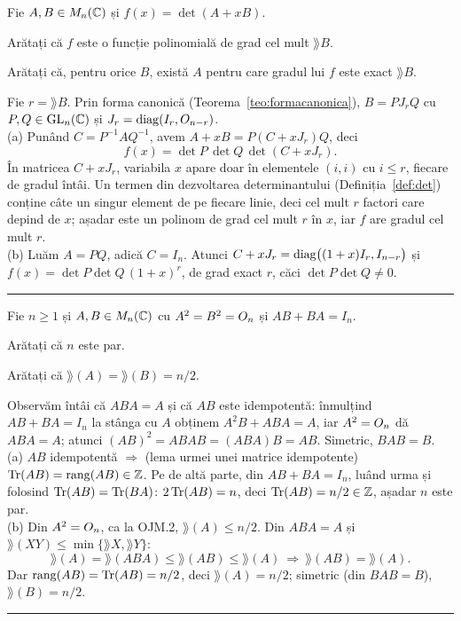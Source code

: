 Fie $A,B\in M_n(\mathbb{C})$ și $f(x)=\det(A+xB)$.
\begin{parti}
  \item Arătați că $f$ este o funcție polinomială de grad cel mult $\rang B$.
  \item Arătați că, pentru orice $B$, există $A$ pentru care gradul lui $f$ este exact $\rang B$.
\end{parti}
\sol Fie $r=\rang B$. Prin forma canonică (Teorema~\ref{teo:formacanonica}), $B=PJ_rQ$ cu $P,Q\in\mathrm{GL}_n(\mathbb{C})$ și $J_r=\operatorname{diag}(I_r,O_{n-r})$.\\[2pt]
(a) Punând $C=P^{-1}AQ^{-1}$, avem $A+xB=P(C+xJ_r)Q$, deci
\[ f(x)=\det P\,\det Q\,\det(C+xJ_r). \]
În matricea $C+xJ_r$, variabila $x$ apare doar în elementele $(i,i)$ cu $i\le r$, fiecare de gradul întâi. Un termen din dezvoltarea determinantului (Definiția~\ref{def:det}) conține câte un singur element de pe fiecare linie, deci cel mult $r$ factori care depind de $x$; așadar este un polinom de grad cel mult $r$ în $x$, iar $f$ are gradul cel mult $r$.\\[2pt]
(b) Luăm $A=PQ$, adică $C=I_n$. Atunci $C+xJ_r=\operatorname{diag}\bigl((1+x)I_r,I_{n-r}\bigr)$ și $f(x)=\det P\det Q\,(1+x)^r$, de grad exact $r$, căci $\det P\det Q\neq0$.
\vspace{1mm}\hrule

Fie $n\ge1$ și $A,B\in M_n(\mathbb{C})$ cu $A^2=B^2=O_n$ și $AB+BA=I_n$.
\begin{parti}
  \item Arătați că $n$ este par.
  \item Arătați că $\rang(A)=\rang(B)=n/2$.
\end{parti}
\sol Observăm întâi că $ABA=A$ și că $AB$ este idempotentă: înmulțind $AB+BA=I_n$ la stânga cu $A$ obținem $A^2B+ABA=A$, iar $A^2=O_n$ dă $ABA=A$; atunci $(AB)^2=ABAB=(ABA)B=AB$. Simetric, $BAB=B$.\\[2pt]
(a) $AB$ idempotentă $\Rightarrow$ (lema urmei unei matrice idempotente) $\operatorname{Tr}(AB)=\operatorname{rang}(AB)\in\mathbb{Z}$. Pe de altă parte, din $AB+BA=I_n$, luând urma și folosind $\operatorname{Tr}(AB)=\operatorname{Tr}(BA)$: $2\operatorname{Tr}(AB)=n$, deci $\operatorname{Tr}(AB)=n/2\in\mathbb{Z}$, așadar $n$ este par.\\[2pt]
(b) Din $A^2=O_n$, ca la OJM.2, $\rang(A)\le n/2$. Din $ABA=A$ și $\rang(XY)\le\min\{\rang X,\rang Y\}$:
\[ \rang(A)=\rang(ABA)\le\rang(AB)\le\rang(A)\ \Longrightarrow\ \rang(AB)=\rang(A). \]
Dar $\operatorname{rang}(AB)=\operatorname{Tr}(AB)=n/2$, deci $\rang(A)=n/2$; simetric (din $BAB=B$), $\rang(B)=n/2$.
\vspace{1mm}\hrule

